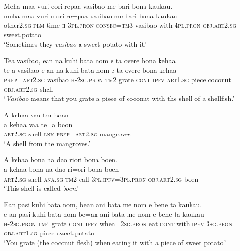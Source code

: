 \ea\label{ex:text01-83}
Meha maa vuri eori repaa vasibao me bari bona kaukau.\\
\gll meha	maa	vuri	e-ori	re=paa	vasibao	me	bari	bona	kaukau\\
     other2.\textsc{sg}	\textsc{plm}	time	\textsc{h}-3\textsc{pl}.\textsc{pron}	\textsc{consec}=\textsc{tm}3	vasibao	with	4\textsc{pl}.\textsc{pron}	\textsc{obj}.\textsc{art}2.\textsc{sg}	sweet.potato\\
\glt `Sometimes they \textit{vasibao} a sweet potato with it.'
\z

\ea\label{ex:text01-84}
Tea vasibao, ean na kuhi bata nom e ta overe bona kehaa.\\
\gll te-a	vasibao	e-an	na	kuhi	bata	nom	e	ta	overe	bona	kehaa\\
     \textsc{prep}=\textsc{art}2.\textsc{sg}	vasibao	\textsc{h}-2\textsc{sg}.\textsc{pron}	\textsc{tm}2	grate	\textsc{cont}	\textsc{ipfv}	\textsc{art}1.\textsc{sg}	piece	coconut	\textsc{obj}.\textsc{art}2.\textsc{sg}	shell\\
\glt `\textit{Vasibao} means that you grate a piece of coconut with the shell of a shellfish.'
\z

\ea\label{ex:text01-85}
A kehaa vaa tea boon.\\
\gll a	kehaa	vaa	te=a	boon\\
     \textsc{art}2.\textsc{sg}	shell	\textsc{lnk}	\textsc{prep}=\textsc{art}2.\textsc{sg}	mangroves\\
\glt `A shell from the mangroves.'
\z

\ea\label{ex:text01-86}
A kehaa bona na dao riori bona boen.\\
\gll a	kehaa	bona	na	dao	ri=ori	bona	boen\\
     \textsc{art}2.\textsc{sg}	shell	\textsc{ana}.\textsc{sg}	\textsc{tm}2	call	3\textsc{pl}.\textsc{ipfv}=3\textsc{pl}.\textsc{pron}	\textsc{obj}.\textsc{art}2.\textsc{sg}	boen\\
\glt `This shell is called \textit{boen}.'
\z

\ea\label{ex:text01-87}
Ean pasi kuhi bata nom, bean ani bata me nom e bene ta kaukau.\\
\gll e-an	pasi	kuhi	bata	nom	be=an	ani	bata	me	nom	e	bene	ta	kaukau\\
     \textsc{h}-2\textsc{sg}.\textsc{pron}	\textsc{tm}4	grate	\textsc{cont}	\textsc{ipfv}	when=2\textsc{sg}.\textsc{pron}	eat	\textsc{cont}	with	\textsc{ipfv}	3\textsc{sg}.\textsc{pron}	\textsc{obj}.\textsc{art}1.\textsc{sg}	piece	sweet.potato\\
\glt `You grate (the coconut flesh) when eating it with a piece of sweet potato.'
\z

